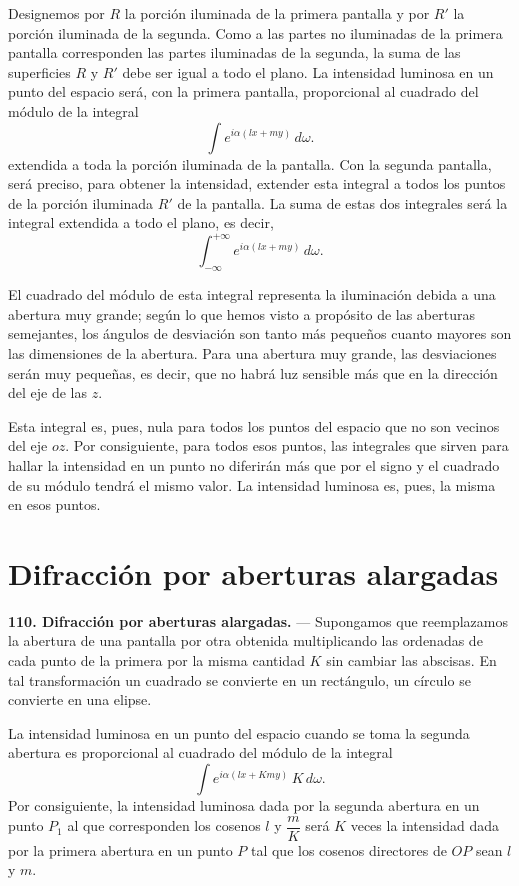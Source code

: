 Designemos por $R$ la porción iluminada de la primera pantalla y por $R'$
la porción iluminada de la segunda. Como a las partes no iluminadas de la
primera pantalla corresponden las partes iluminadas de la segunda, la
suma de las superficies $R$ y $R'$ debe ser igual a todo el plano. La
intensidad luminosa en un punto del espacio será, con la primera
pantalla, proporcional al cuadrado del módulo de la integral
\[
\int e^{i\alpha(lx+my)}\,d\omega.
\]
extendida a toda la porción iluminada de la pantalla. Con la segunda
pantalla, será preciso, para obtener la intensidad, extender esta
integral a todos los puntos de la porción iluminada $R'$ de la pantalla.
La suma de estas dos integrales será la integral extendida a todo el
plano, es decir,
\[
\int_{-\infty}^{+\infty} e^{i\alpha(lx+my)}\,d\omega.
\]

El cuadrado del módulo de esta integral representa la iluminación debida
a una abertura muy grande; según lo que hemos visto a propósito de las
aberturas semejantes, los ángulos de desviación son tanto más pequeños
cuanto mayores son las dimensiones de la abertura. Para una abertura muy
grande, las desviaciones serán muy pequeñas, es decir, que no habrá luz
sensible más que en la dirección del eje de las $z$.

Esta integral es, pues, nula para todos los puntos del espacio que no son
vecinos del eje $oz$. Por consiguiente, para todos esos puntos, las
integrales que sirven para hallar la intensidad en un punto no
diferirán más que por el signo y el cuadrado de su módulo tendrá el mismo
valor. La intensidad luminosa es, pues, la misma en esos puntos.

\section{Difracción por aberturas alargadas}

\noindent\textbf{110. Difracción por aberturas alargadas.} — Supongamos
que reemplazamos la abertura de una pantalla por otra obtenida
multiplicando las ordenadas de cada punto de la primera por la misma
cantidad $K$ sin cambiar las abscisas. En tal transformación un cuadrado
se convierte en un rectángulo, un círculo se convierte en una elipse.

La intensidad luminosa en un punto del espacio cuando se toma la segunda
abertura es proporcional al cuadrado del módulo de la integral
\[
\int e^{i\alpha(lx+Kmy)}\,K\,d\omega.
\]
Por consiguiente, la intensidad luminosa dada por la segunda abertura en
un punto $P_1$ al que corresponden los cosenos $l$ y $\dfrac{m}{K}$ será
$K$ veces la intensidad dada por la primera abertura en un punto $P$ tal
que los cosenos directores de $OP$ sean $l$ y $m$.

